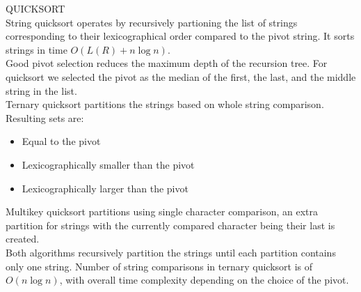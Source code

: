 {\sffamily\small{\color{sciorange} QUICKSORT}}\vspace{1mm}\\
\footnotesize 
String quicksort operates by recursively partioning the list of strings corresponding to their lexicographical order compared to the pivot string. It sorts strings in time $O(L(R) + n \log n)$.\\ 

Good pivot selection reduces the maximum depth of the recursion tree. For quicksort we selected the pivot as the median of the first, the last, and the middle string in the list.\\

Ternary quicksort partitions the strings based on whole string comparison. Resulting sets are:
    
\begin{itemize}
    \item Equal to the pivot\vspace{-1mm}
    \item Lexicographically smaller than the pivot\vspace{-1mm}
    \item Lexicographically larger than the pivot
\end{itemize}

Multikey quicksort partitions using single character comparison, an extra partition for strings with the currently compared character being their last is created.\\

Both algorithms recursively partition the strings until each partition contains only one string.  Number of string comparisons in ternary quicksort is of $O(n \log n)$, with overall time complexity depending on the choice of the pivot.




